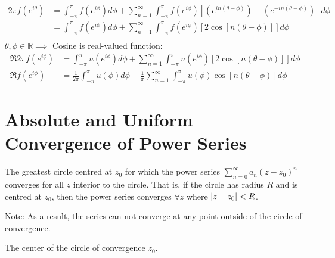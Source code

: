 \documentclass[12pt, english]{book}
\makeatletter
\renewenvironment{proof}[1][\proofname]{\par
	\pushQED{\qed}%
	\normalfont \topsep6\p@\@plus6\p@\relax
	\list{}{%
		\settowidth{\leftmargin}{\itshape\proofname:\hskip\labelsep}%
		\setlength{\labelwidth}{0pt}%
		\setlength{\itemindent}{-\leftmargin}%
		}%
	\item[\hskip\labelsep\itshape#1\@addpunct{:}]\ignorespaces
	}{\popQED\endlist\@endpefalse}
\makeatother
\begin{document}
\begin{example}
\begin{proof}
{			\begin{align*}
				2\pi f(e^{i\theta})
				&= \int_{-\pi}^{\pi} f(e^{i\phi}) d\phi + \sum_{n=1}^{\infty} 
				\int_{-\pi}^{\pi} f(e^{i\phi}) 
				\left[ \left( e^{in(\theta-\phi)} \right)
				+  \left(e^{-in(\theta-\phi)} \right)  \right] d\phi \\
				&= \int_{-\pi}^{\pi} f(e^{i\phi}) d\phi + \sum_{n=1}^{\infty} 
				\int_{-\pi}^{\pi} f(e^{i\phi}) 
				\left[ 2\cos[n(\theta-\phi)] \right] d\phi \\
			\end{align*}
			\(\theta,\phi \in \mathbb{R} \implies \) Cosine is real-valued function:
			\begin{align*}
				\Re{2\pi f(e^{i\phi})} 
				&= \int_{-\pi}^{\pi} u(e^{i\phi}) d\phi + \sum_{n=1}^{\infty} 
				\int_{-\pi}^{\pi} u(e^{i\phi}) 
				\left[ 2\cos[n(\theta-\phi)] \right] d\phi \\
				\Re{f(e^{i\phi})} 
				&= \frac{1}{2\pi} \int_{-\pi}^{\pi} u(\phi) d\phi 
				 + \frac{1}{\pi} \sum_{n=1}^{\infty} \int_{-\pi}^{\pi} u(\phi) 
				 \cos[n(\theta-\phi)] d\phi
			\end{align*}
			}
		\end{proof}
	\end{example}
	
	\section{Absolute and Uniform Convergence of Power Series} \label{Absolute and Uniform Convergence of Power Series Section - Complex}
	
	\begin{definition}
		\label{Circle of Convergence Definition - Complex}
		The greatest circle centred at \(z_0\) for which the power series \(\sum_{n=0}^{\infty} a_n (z-z_0)^n\) converges for all \(z\) interior to the circle. That is, if the circle has radius \(R\) and is centred at \(z_0\), then the power series converges \(\forall z\) where \(\abs{z-z_0} < R\). 
	\end{definition}
	Note: As a result, the series can not converge at any point outside of the circle of convergence.
	
	\begin{definition}
		The center of the circle of convergence \(z_0\).
	\end{definition}
	
\end{document}
